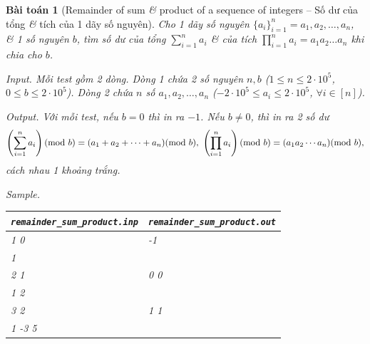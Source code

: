 \documentclass{article}
\newtheorem{baitoan}{Bài toán}
\begin{document}
\begin{baitoan}[Remainder of sum {\it\&} product of a sequence of integers -- Số dư của tổng {\it\&} tích của 1 dãy số nguyên]
	Cho 1 dãy số nguyên $\{a_i\}_{i=1}^n = a_1,a_2,\ldots,a_n$, {\it\&} 1 số nguyên $b$, tìm số dư của tổng $\sum_{i=1}^n a_i$ {\it\&} của tích $\prod_{i=1}^n a_i = a_1a_2\ldots a_n$ khi chia cho $b$.
	\item {\sf Input.} Mỗi test gồm 2 dòng. Dòng 1 chứa 2 số nguyên $n,b$ ($1\le n\le2\cdot10^5$, $0\le b\le2\cdot10^5$). Dòng 2 chứa $n$ số $a_1,a_2,\ldots,a_n$ ($-2\cdot10^5\le a_i\le2\cdot10^5$, $\forall i\in[n]$).
	\item {\sf Output.} Với mỗi test, nếu $b = 0$ thì in ra $-1$. Nếu $b\ne0$, thì in ra 2 số dư
	\begin{equation*}
		\left(\sum_{i=1}^n a_i\right)({\rm mod}\ b) = (a_1 + a_2 + \cdots + a_n)({\rm mod}\ b),\ \left(\prod_{i=1}^n a_i\right)({\rm mod}\ b) = (a_1a_2\cdots a_n)({\rm mod}\ b),
	\end{equation*}
	cách nhau 1 khoảng trắng.
	\item {\sf Sample.}
	\begin{table}[H]
		\centering
		\begin{tabular}{|l|l|}
			\hline
			\verb|remainder_sum_product.inp| & \verb|remainder_sum_product.out| \\
			\hline
			1 0 & -1 \\
			1 & \\
			\hline
			2 1 & 0 0\\
			1 2 & \\
			\hline
			3 2 & 1 1\\
			1 -3 5 & \\
			\hline
		\end{tabular}
	\end{table}
\end{baitoan}
\end{document}
